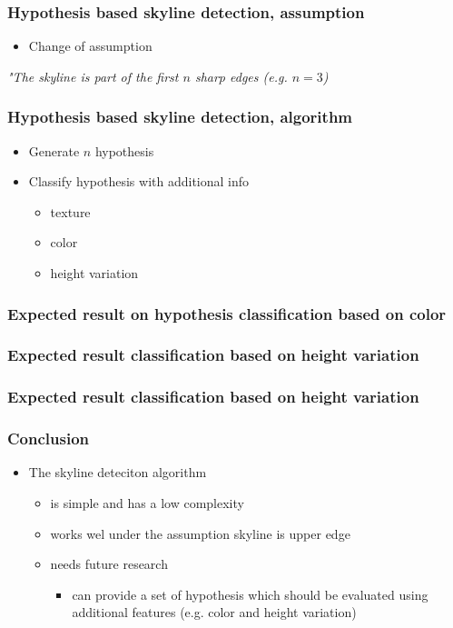 \documentclass{beamer}
\begin{document}
\frame
{
	\frametitle{Hypothesis based skyline detection, assumption}
	\begin{itemize}
	\item <+-| alert@+> Change of assumption
	\end{itemize}
	\emph{"The skyline is part of the first $n$ sharp edges (e.g.  $n=3$)}
}

\frame
{
	\frametitle{Hypothesis based skyline detection, algorithm}
	\begin{itemize}
	\item <+-| alert@+> Generate $n$ hypothesis
	\item <+-| alert@+> Classify hypothesis with additional info
		\begin{itemize}
		\item <+-| alert@+> texture 
		\item <+-| alert@+> color
		\item <+-| alert@+> height variation 
		\end{itemize}
	\end{itemize}
}

\frame
{
	\frametitle{Expected result on hypothesis classification based on color}
}

\frame
{
	\frametitle{Expected result classification based on height variation}
}
\frame
{
	\frametitle{Expected result classification based on height variation}
}

\frame
{
	\frametitle{Conclusion}
	\begin{itemize}
	\item <+-| alert@+> The skyline deteciton algorithm 
		\begin{itemize}
		\item <+-| alert@+> is simple and has a low complexity
		\item <+-| alert@+> works wel under the assumption skyline is upper edge
		\item <+-| alert@+> needs future research
			\begin{itemize}
			\item <+-| alert@+> can provide a set of hypothesis which should be evaluated using additional features
			(e.g. color and height variation)
			\end{itemize}
		\end{itemize}
	\end{itemize}
}
\end{document}

